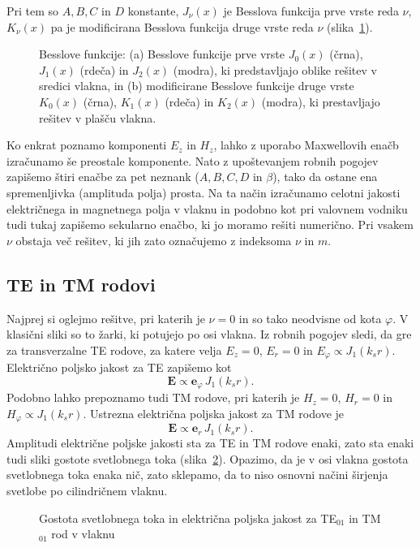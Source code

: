 Pri tem so $A,B,C$ in $D$ konstante, $J_\nu(x)$ je Besslova funkcija prve vrste reda 
$\nu$, $K_\nu(x)$ pa je modificirana Besslova funkcija druge vrste reda $\nu$ 
(slika~\ref{fig:J01}). 
\begin{figure}[h]
\centering
\def\svgwidth{140truemm} 
 
\caption{Besslove funkcije: (a) Besslove funkcije prve vrste 
$J_0(x)$ (črna), $J_1(x)$ (rdeča) in $J_2(x)$ (modra), 
ki predstavljajo oblike rešitev v sredici vlakna, in (b)
modificirane Besslove funkcije druge vrste $K_0(x)$ (črna), $K_1(x)$ (rdeča) in $K_2(x)$ (modra), 
ki prestavljajo rešitev v plašču vlakna.}
\label{fig:J01}
\end{figure}

Ko enkrat poznamo komponenti $E_z$ in $H_z$, lahko z uporabo Maxwellovih enačb izračunamo še 
preostale komponente. Nato z upoštevanjem robnih pogojev zapišemo štiri enačbe za 
pet neznank ($A,B,C,D$ in $\beta$),
tako da ostane ena spremenljivka (amplituda polja) prosta. Na ta način izračunamo celotni 
jakosti električnega in magnetnega polja v vlaknu in podobno kot pri valovnem vodniku 
tudi tukaj zapišemo sekularno enačbo, ki jo moramo rešiti numerično. Pri vsakem $\nu$ obstaja 
več rešitev, ki jih zato označujemo z indeksoma $\nu$ in $m$. 

\subsection*{TE in TM rodovi}
Najprej si oglejmo rešitve, pri katerih je $\nu=0$ in so tako neodvisne od kota $\varphi$. 
V klasični sliki so to žarki, ki potujejo po osi vlakna. Iz robnih pogojev sledi, da 
gre za transverzalne TE rodove, za katere velja $E_z=0$, $E_r=0$ in $E_\varphi \propto J_1(k_sr)$.
Električno poljsko jakost za TE zapišemo kot 
\begin{equation}
\mathbf{E} \propto \mathbf{e}_\varphi \, J_1(k_s r).
\end{equation}
Podobno lahko prepoznamo tudi TM rodove, pri katerih je $H_z=0$, $H_r=0$ in $H_\varphi \propto J_1(k_sr)$.
Ustrezna električna poljska jakost za TM rodove je
\begin{equation}
\mathbf{E} \propto \mathbf{e}_r \, J_1(k_s r).
\end{equation}
Amplitudi električne poljske jakosti sta za TE in TM rodove enaki, zato
sta enaki tudi sliki gostote svetlobnega toka (slika~\ref{fig:TE01}). Opazimo, da je v osi
vlakna gostota svetlobnega toka enaka nič, zato sklepamo, da to niso osnovni načini 
širjenja svetlobe po cilindričnem vlaknu. 
\begin{figure}[h]
\centering
\def\svgwidth{100truemm} 

\caption{Gostota svetlobnega toka in električna poljska jakost za TE$_{01}$ in TM$_{01}$ rod
v vlaknu}
\label{fig:TE01}
\end{figure}

